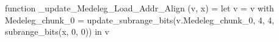 function _update_Medeleg_Load_Addr_Align (v, x) = let v = { v with Medeleg_chunk_0 = update_subrange_bits(v.Medeleg_chunk_0, 4, 4, subrange_bits(x, 0, 0)) } in
  v
